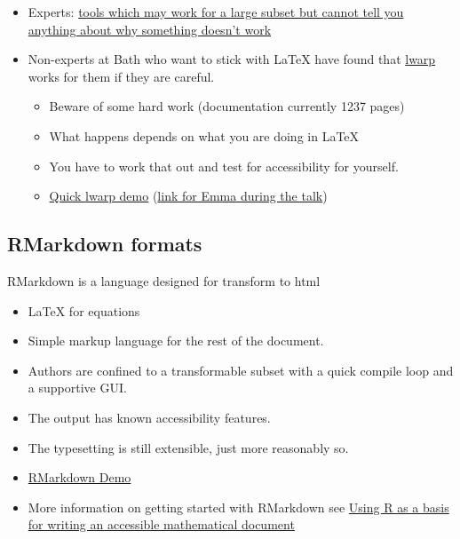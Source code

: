 \documentclass[
  12pt,
  a4paper]{extarticle}
\providecommand{\tightlist}{%
  \setlength{\itemsep}{0pt}\setlength{\parskip}{0pt}}
\theoremstyle{plain}
\theoremstyle{plain}
\theoremstyle{plain}
\theoremstyle{plain}
\theoremstyle{plain}
\theoremstyle{definition}
\theoremstyle{definition}
\theoremstyle{definition}
\theoremstyle{remark}
\renewcommand{\;}{\,}
\begin{document}
\begin{itemize}
\tightlist
\item
  Experts: \href{https://hub.docker.com/r/bathmash/mathaltnotes}{tools which may work for a large subset but cannot tell you anything about why something doesn't work}
\item
  Non-experts at Bath who want to stick with LaTeX have found that \href{https://ctan.org/pkg/lwarp?lang=en}{lwarp} works for them if they are careful.

  \begin{itemize}
  \tightlist
  \item
    Beware of some hard work (documentation currently 1237 pages)
  \item
    What happens depends on what you are doing in LaTeX
  \item
    You have to work that out and test for accessibility for yourself.
  \item
    \href{LINK}{Quick lwarp demo} (\href{https://posit.cloud/content/5641574}{link for Emma during the talk})
  \end{itemize}
\end{itemize}

\hypertarget{rmarkdown-formats}{%
\subsection{RMarkdown formats}\label{rmarkdown-formats}}

RMarkdown is a language designed for transform to html

\begin{itemize}
\tightlist
\item
  LaTeX for equations
\item
  Simple markup language for the rest of the document.
\item
  Authors are confined to a transformable subset with a quick compile loop and a supportive GUI.
\item
  The output has known accessibility features.
\item
  The typesetting is still extensible, just more reasonably so.
\item
  \href{}{RMarkdown Demo}
\item
  More information on getting started with RMarkdown see \href{https://stem-enable.github.io/RMarkdownWorkshop/}{Using R as a basis for writing an accessible mathematical document}
\end{itemize}
\end{document}
